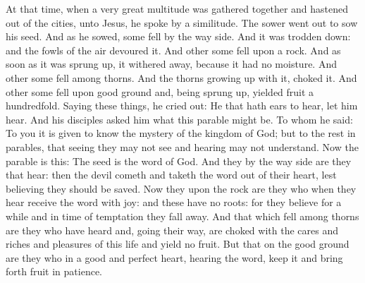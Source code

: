
At that time, when a very great multitude was gathered together and hastened out of the
cities, unto Jesus, he spoke by a similitude.  The sower went out to sow his
seed. And as he sowed, some fell by the way side. And it was trodden down: and
the fowls of the air devoured it.  And other some fell upon a rock. And as soon
as it was sprung up, it withered away, because it had no moisture.  And other
some fell among thorns. And the thorns growing up with it, choked it.  And
other some fell upon good ground and, being sprung up, yielded fruit a
hundredfold. Saying these things, he cried out: He that hath ears to hear, let
him hear.  And his disciples asked him what this parable might be.  To whom he
said: To you it is given to know the mystery of the kingdom of God; but to the
rest in parables, that seeing they may not see and hearing may not understand.
 Now
the parable is this: The seed is the word of God.  And they by the way side are
they that hear: then the devil cometh and taketh the word out of their heart,
lest believing they should be saved.  Now they upon the rock are they who when
they hear receive the word with joy: and these have no roots: for they believe
for a while and in time of temptation they fall away.  And that which fell
among thorns are they who have heard and, going their way, are choked with the
cares and riches and pleasures of this life and yield no fruit.  But that on
the good ground are they who in a good and perfect heart, hearing the word,
keep it and bring forth fruit in patience.






